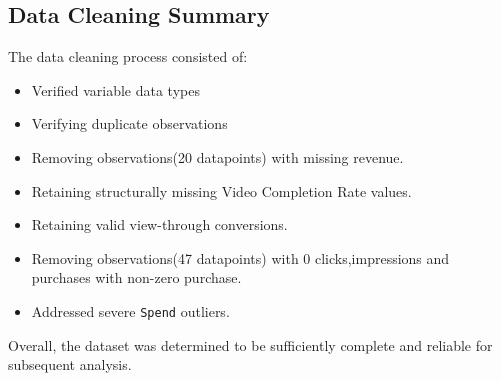 	
	\subsection{Data Cleaning Summary}
	
	The data cleaning process consisted of:
	
	\begin{itemize}
		\item Verified variable data types
		
		\item Verifying duplicate observations
		
		\item Removing observations(20 datapoints) with missing revenue.
		
		\item Retaining structurally missing Video Completion Rate values.
		
		\item Retaining valid view-through conversions.
		
		\item Removing observations(47 datapoints) with 0 clicks,impressions and purchases with non-zero purchase. 
		
		\item Addressed severe \texttt{Spend} outliers.
		

	
		
	\end{itemize}
	
	Overall, the dataset was determined to be sufficiently complete and reliable for subsequent analysis.
	
